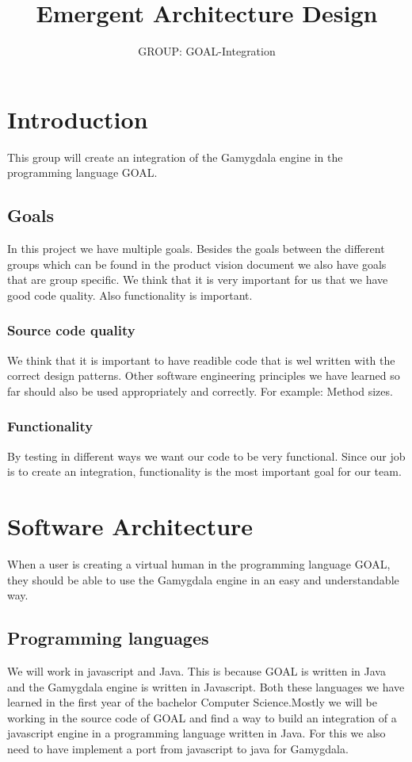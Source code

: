 \documentclass[]{article}
\title{Emergent Architecture Design}
\author{GROUP: GOAL-Integration}
\begin{document}
\section{Introduction}
This group will create an integration of the Gamygdala engine in the programming language GOAL.
\subsection{Goals}
In this project we have multiple goals. Besides the goals between the different groups which can be found in the product vision document we also have goals that are group specific. We think that it is very important for us that we have good code quality. Also functionality is important.

\subsubsection{Source code quality}
We think that it is important to have readible code that is wel written with the correct design patterns. Other software engineering principles we have learned so far should also be used appropriately and correctly. For example: Method sizes.

\subsubsection{Functionality}
By testing in different ways we want our code to be very functional. Since our job is to create an integration, functionality is the most important goal for our team.


\section{Software Architecture}
When a user is creating a virtual human in the programming language GOAL, they should be able to use the Gamygdala engine in an easy and understandable way.
\subsection{Programming languages}
We will work in javascript and Java. This is because GOAL is written in Java and the Gamygdala engine is written in Javascript. Both these languages we have learned in the first year of the bachelor Computer Science.Mostly we will be working in the source code of GOAL and find a way to build an integration of a javascript engine in a programming language written in Java. For this we also need to have implement a port from javascript to java for Gamygdala.
\end{document}
